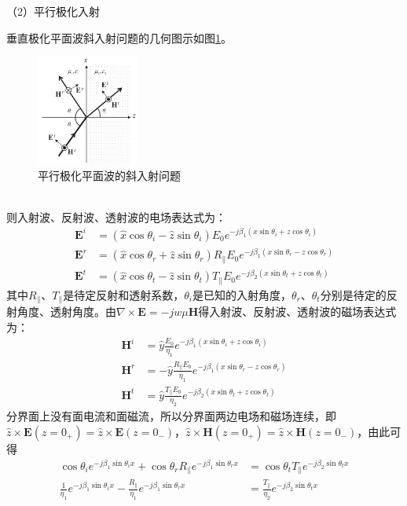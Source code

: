 \documentclass{article}
\numberwithin{equation}{section}
\begin{document}
（2）平行极化入射\par
垂直极化平面波斜入射问题的几何图示如图\ref{fig:fig45}。
\begin{figure}[ht]
    \centering
    \includegraphics[width=0.3\textwidth]{平行极化平面波的斜入射问题.PNG}
    \caption{平行极化平面波的斜入射问题}
    \label{fig:fig45}
\end{figure}
\\
则入射波、反射波、透射波的电场表达式为：
\begin{align}
    \label{eq:eq418}
    \mathbf{E}^i&=(\hat{x}\cos\theta_i-\hat{z}\sin\theta_i)E_0e^{-j\beta_1(x\sin\theta_i+z\cos\theta_i)} \\
    \label{eq:eq419}
    \mathbf{E}^r&=(\hat{x}\cos\theta_r+\hat{z}\sin\theta_r)R_{\parallel}E_0e^{-j\beta_1(x\sin\theta_r-z\cos\theta_r)} \\
    \label{eq:eq420}
    \mathbf{E}^t&=(\hat{x}\cos\theta_t-\hat{z}\sin\theta_t)T_{\parallel}E_0e^{-j\beta_2(x\sin\theta_t+z\cos\theta_t)}
\end{align}
其中$R_{\parallel}$、$T_{\parallel}$是待定反射和透射系数，$\theta_i$是已知的入射角度，$\theta_r$、$\theta_t$分别是待定的反射角度、透射角度。由$\nabla\times\mathbf{E}=-jw\mu\mathbf{H}$得入射波、反射波、透射波的磁场表达式为：
\begin{align}
    \label{eq:eq421}
    \mathbf{H}^i&=\hat{y}\frac{E_0}{\eta_1}e^{-j\beta_1(x\sin\theta_i+z\cos\theta_i)} \\
    \label{eq:eq422}
    \mathbf{H}^r&=-\hat{y}\frac{R_{\parallel}E_0}{\eta_1}e^{-j\beta_1(x\sin\theta_r-z\cos\theta_r)} \\
    \label{eq:eq423}
    \mathbf{H}^t&=\hat{y}\frac{T_{\parallel}E_0}{\eta_2}e^{-j\beta_2(x\sin\theta_t+z\cos\theta_t)}
\end{align}
分界面上没有面电流和面磁流，所以分界面两边电场和磁场连续，即$\hat{z}\times\mathbf{E}(z=0_+)=\hat{z}\times\mathbf{E}(z=0_-)$，$\hat{z}\times\mathbf{H}(z=0_+)=\hat{z}\times\mathbf{H}(z=0_-)$，由此可得
\begin{align}
    \label{eq:eq424}
    \cos\theta_ie^{-j\beta_1\sin\theta_ix}+\cos\theta_rR_{\parallel}e^{-j\beta_1\sin\theta_rx}&=\cos\theta_tT_{\parallel}e^{-j\beta_2\sin\theta_tx} \\
    \label{eq:eq425}
    \frac{1}{\eta_1}e^{-j\beta_1\sin\theta_ix}-\frac{R_{\parallel}}{\eta_1}e^{-j\beta_1\sin\theta_rx}&=\frac{T_{\parallel}}{\eta_2}e^{-j\beta_2\sin\theta_tx}
\end{align}
\end{document}

